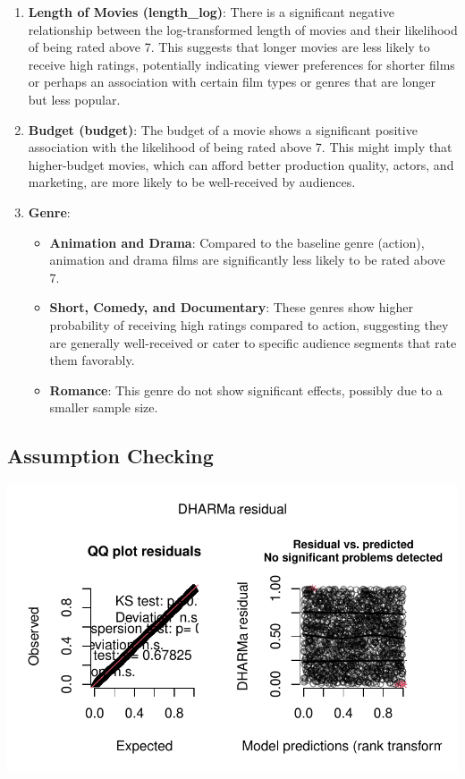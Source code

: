 \documentclass[
  11pt,
]{article}
\providecommand{\tightlist}{%
  \setlength{\itemsep}{0pt}\setlength{\parskip}{0pt}}\usepackage{longtable,booktabs,array}
\begin{document}
\begin{enumerate}
\def\labelenumi{\arabic{enumi}.}
\item
  \textbf{Length of Movies (length\_log)}: There is a significant
  negative relationship between the log-transformed length of movies and
  their likelihood of being rated above 7. This suggests that longer
  movies are less likely to receive high ratings, potentially indicating
  viewer preferences for shorter films or perhaps an association with
  certain film types or genres that are longer but less popular.
\item
  \textbf{Budget (budget)}: The budget of a movie shows a significant
  positive association with the likelihood of being rated above 7. This
  might imply that higher-budget movies, which can afford better
  production quality, actors, and marketing, are more likely to be
  well-received by audiences.
\item
  \textbf{Genre}:

  \begin{itemize}
  \tightlist
  \item
    \textbf{Animation and Drama}: Compared to the baseline genre
    (action), animation and drama films are significantly less likely to
    be rated above 7.
  \item
    \textbf{Short, Comedy, and Documentary}: These genres show higher
    probability of receiving high ratings compared to action, suggesting
    they are generally well-received or cater to specific audience
    segments that rate them favorably.
  \item
    \textbf{Romance}: This genre do not show significant effects,
    possibly due to a smaller sample size.
  \end{itemize}
\end{enumerate}

\hypertarget{assumption-checking}{%
\subsection{Assumption Checking}\label{assumption-checking}}

\includegraphics{Group_07_Analysis_files/figure-pdf/unnamed-chunk-32-1.pdf}
\end{document}
